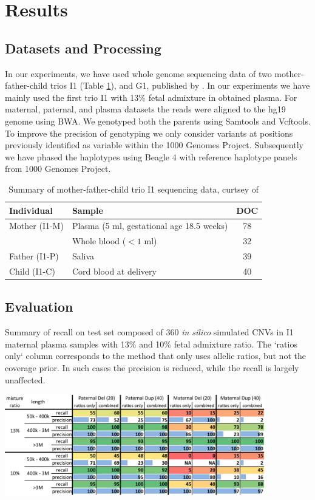 \section{Results}

\subsection{Datasets and Processing}
\label{data}
In our experiments, we have used whole genome sequencing data of two mother-father-child trios I1 (Table \ref{tab:I1}), and G1, published by \cite{kitzman2012}. In our experiments we have mainly used the first trio I1 with 13\% fetal admixture in obtained plasma. For maternal, paternal, and plasma datasets the reads were aligned to the hg19 genome using BWA. We genotyped both the parents using Samtools and Vcftools. To improve the precision of genotyping we only consider variants at positions previously identified as variable within the 1000 Genomes Project.  Subsequently we have phased the haplotypes using Beagle 4 \citep{browning2013} with reference haplotype panels from 1000 Genomes Project. 
\begin{table}
\caption{Summary of mother-father-child trio I1 sequencing data, curtsey of \cite{kitzman2012}  }
\label{tab:I1}
\centering
\footnotesize
\begin{tabular}{l|l|c}
\hline
Individual & Sample & DOC \\ \hline\hline
Mother (I1-M) & Plasma (5 ml, gestational age 18.5 weeks) & 78 \\
	& Whole blood ($<1$ ml) & 32 \\
Father (I1-P) & Saliva & 39 \\
Child (I1-C) & Cord blood at delivery & 40 \\
\hline
\end{tabular}
\end{table}

\subsection{Evaluation}
\begin{table}
\caption{Summary of recall on test set composed of 360 \emph{in silico} simulated CNVs in I1 maternal plasma samples with 13\% and 10\% fetal admixture ratio. The `ratios only` column corresponds to the method that only uses allelic ratios, but not the coverage prior. In such cases the precision is reduced, while the recall is largely unaffected.  }
\label{tab:resRecall}
\centering
\includegraphics[width=0.85\textwidth]{figures/ismb_res_color}
\end{table}

